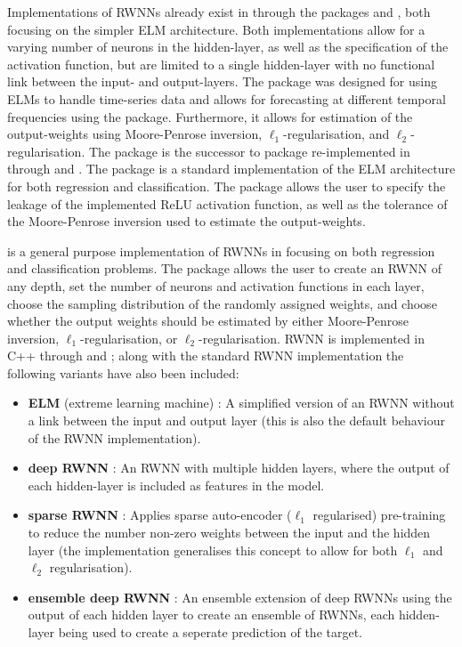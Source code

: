 \documentclass[
]{jss}
\providecommand{\tightlist}{%
  \setlength{\itemsep}{0pt}\setlength{\parskip}{0pt}}
\begin{document}
Implementations of RWNNs already exist in  through the
packages  \citep{nnfor} and 
\citep{elmNNRcpp}, both focusing on the simpler ELM architecture. Both
implementations allow for a varying number of neurons in the
hidden-layer, as well as the specification of the activation function,
but are limited to a single hidden-layer with no functional link between
the input- and output-layers. The  package was designed for
using ELMs to handle time-series data and allows for forecasting at
different temporal frequencies using the  package.
Furthermore, it allows for estimation of the output-weights using
Moore-Penrose inversion, \(\ell_1\)-regularisation, and
\(\ell_2\)-regularisation. The  package is the successor
to  package \citep{elmNN} re-implemented in 
through  and  \citep{Rcpp, RcppA}. The
package is a standard implementation of the ELM architecture for both
regression and classification. The package allows the user to specify
the leakage of the implemented ReLU activation function, as well as the
tolerance of the Moore-Penrose inversion used to estimate the
output-weights.

 is a general purpose implementation of RWNNs in 
\citep{R} focusing on both regression and classification problems. The
 package allows the user to create an RWNN of any depth, set
the number of neurons and activation functions in each layer, choose the
sampling distribution of the randomly assigned weights, and choose
whether the output weights should be estimated by either Moore-Penrose
inversion, \(\ell_1\)-regularisation, or \(\ell_2\)-regularisation. RWNN
is implemented in C++ through  and ; along
with the standard RWNN implementation the following variants have also
been included:

\begin{itemize}
\tightlist
\item
  \textbf{ELM} (extreme learning machine) \citep{Huang2006}: A
  simplified version of an RWNN without a link between the input and
  output layer (this is also the default behaviour of the RWNN
  implementation).
\item
  \textbf{deep RWNN} \citep{Henriquez2018}: An RWNN with multiple hidden
  layers, where the output of each hidden-layer is included as features
  in the model.
\item
  \textbf{sparse RWNN} \citep{Zhang2019}: Applies sparse auto-encoder
  (\(\ell_1\) regularised) pre-training to reduce the number non-zero
  weights between the input and the hidden layer (the implementation
  generalises this concept to allow for both \(\ell_1\) and \(\ell_2\)
  regularisation).
\item
  \textbf{ensemble deep RWNN} \citep{Shi2021}: An ensemble extension of
  deep RWNNs using the output of each hidden layer to create an ensemble
  of RWNNs, each hidden-layer being used to create a seperate prediction
  of the target.
\end{itemize}
\end{document}
